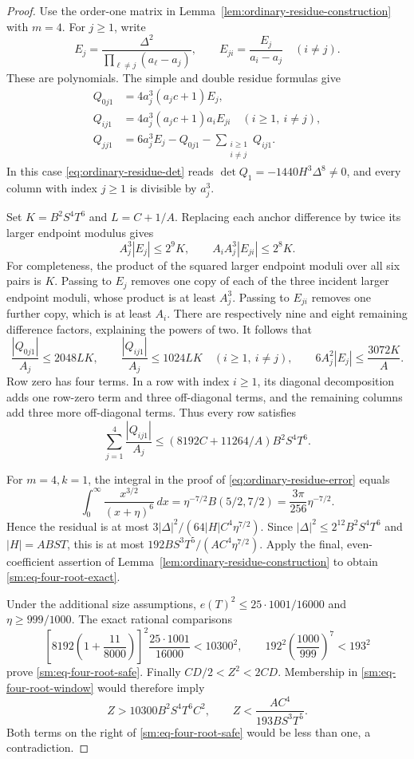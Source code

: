 \documentclass[12pt]{article}
\numberwithin{equation}{section}
\begin{document}
\begin{proof}
Use the order-one matrix in Lemma~\ref{lem:ordinary-residue-construction}
with \(m=4\). For \(j\ge1\), write
\[
 E_j=\frac{\Delta^2}{\prod_{\ell\ne j}(a_\ell-a_j)},\qquad
 E_{ji}=\frac{E_j}{a_i-a_j}\quad(i\ne j).
\]
These are polynomials. The simple and double residue formulas give
\begin{align*}
 Q_{0j1}&=4a_j^3(a_jc+1)E_j,\\
 Q_{ij1}&=4a_j^3(a_jc+1)a_iE_{ji}\quad(i\ge1,\ i\ne j),\\
 Q_{jj1}&=6a_j^3E_j-Q_{0j1}-\sum_{\substack{i\ge1\\i\ne j}}Q_{ij1}.
\end{align*}
In this case \eqref{eq:ordinary-residue-det} reads
\(\det Q_1=-1440H^3\Delta^8\ne0\), and every column with index $j\ge1$
is divisible by \(a_j^3\).

Set \(K=B^2S^4T^6\) and \(L=C+1/A\). Replacing each anchor
difference by twice its larger endpoint modulus gives
\[
 A_j^3|E_j|\le2^9K,\qquad
 A_iA_j^3|E_{ji}|\le2^8K.
\]
For completeness, the product of the squared larger endpoint moduli over
all six pairs is \(K\). Passing to \(E_j\) removes one copy of
each of the three incident larger endpoint moduli, whose product is at
least \(A_j^3\). Passing to \(E_{ji}\) removes one further copy,
which is at least \(A_i\). There are respectively nine and eight
remaining difference factors, explaining the powers of two.
It follows that
\[
 \frac{|Q_{0j1}|}{A_j}\le2048LK,\qquad
 \frac{|Q_{ij1}|}{A_j}\le1024LK\quad(i\ge1,\ i\ne j),
 \qquad 6A_j^2|E_j|\le\frac{3072K}{A}.
\]
Row zero has four terms. In a row with index $i\ge1$, its diagonal decomposition
adds one row-zero term and three off-diagonal terms, and the remaining
columns add three more off-diagonal terms. Thus every row satisfies
\[
 \sum_{j=1}^4\frac{|Q_{ij1}|}{A_j}
 \le(8192C+11264/A)B^2S^4T^6.
\]

For \(m=4,k=1\), the integral in the proof of
\eqref{eq:ordinary-residue-error} equals
\[
 \int_0^\infty\frac{x^{3/2}}{(x+\eta)^6}\,dx
 =\eta^{-7/2}B(5/2,7/2)
 =\frac{3\pi}{256}\eta^{-7/2}.
\]
Hence the residual is at most
\(3|\Delta|^2/(64|H|C^4\eta^{7/2})\).
Since \(|\Delta|^2\le2^{12}B^2S^4T^6\) and \(|H|=ABST\),
this is at most \(192BS^3T^5/(AC^4\eta^{7/2})\).
Apply the final, even-coefficient assertion of
Lemma~\ref{lem:ordinary-residue-construction} to obtain
\eqref{sm:eq-four-root-exact}.

Under the additional size assumptions,
\(e(T)^2\le25\cdot1001/16000\) and \(\eta\ge999/1000\).
The exact rational comparisons
\[
 \left[8192\left(1+\frac{11}{8000}\right)\right]^2
 \frac{25\cdot1001}{16000}<10300^2,
 \qquad
 192^2\left(\frac{1000}{999}\right)^7<193^2
\]
prove \eqref{sm:eq-four-root-safe}.
Finally \(CD/2<Z^2<2CD\). Membership in
\eqref{sm:eq-four-root-window} would therefore imply
\[
 Z>10300B^2S^4T^6C^2,\qquad
 Z<\frac{AC^4}{193BS^3T^5}.
\]
Both terms on the right of \eqref{sm:eq-four-root-safe} would be less
than one, a contradiction.
\end{proof}
\end{document}
